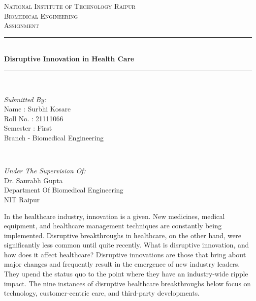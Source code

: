 \documentclass[12pt]{article}
\begin{document}
\begin{titlepage}
\newcommand{\HRule}{\rule{\linewidth}{0.5mm}}
\center
\textsc{\LARGE National Institute of Technology Raipur}\\[1.0cm]


\textsc{\Large Biomedical Engineering}\\[0.5cm] 
\textsc{\large Assignment}\\[0.5cm]
\HRule\\[0.4cm]
	
	{\huge\bfseries Disruptive Innovation in Health Care }\\[0.1cm]
	\HRule\\[1.1cm]
	\begin{minipage}{0.4\textwidth}
		\begin{flushleft}
			\large
			\textit{Submitted By:}\\
          		Name : Surbhi Kosare \\
			   Roll No. : 21111066\\
			   Semester : First\\
			   Branch - Biomedical Engineering 
			   
			\end{flushleft}
	\end{minipage}
	~
	\begin{minipage}{0.5\textwidth}
		\begin{flushright}
			\large
			\textit{Under The Supervision Of:}\\
			Dr. Saurabh Gupta\\
			Department Of Biomedical Engineering\\
			NIT Raipur
		\end{flushright}
	\end{minipage}
	\vfill\vfill\vfill 
	
	
	\vfill 
\end{titlepage}



In the healthcare industry, innovation is a given. New medicines, medical equipment, and healthcare management techniques are constantly being implemented. Disruptive breakthroughs in healthcare, on the other hand, were significantly less common until quite recently. What is disruptive innovation, and how does it affect healthcare? Disruptive innovations are those that bring about major changes and frequently result in the emergence of new industry leaders. They upend the status quo to the point where they have an industry-wide ripple impact. The nine instances of disruptive healthcare breakthroughs below focus on technology, customer-centric care, and third-party developments.
\end{document}
